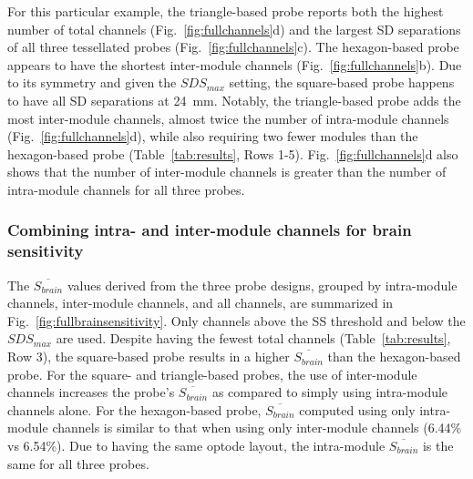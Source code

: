 \begin{figure}
\end{figure} 

For this particular example, the triangle-based probe reports both the highest number of total channels (Fig.~\ref{fig:fullchannels}d) and the largest SD separations of all three tessellated probes (Fig.~\ref{fig:fullchannels}c). The hexagon-based probe appears to have the shortest inter-module channels (Fig.~\ref{fig:fullchannels}b). Due to its symmetry and given the $SDS_{max}$ setting, the square-based probe happens to have all SD separations at 24~mm. Notably, the triangle-based probe adds the most inter-module channels, almost twice the number of intra-module channels (Fig.~\ref{fig:fullchannels}d), while also requiring two fewer modules than the hexagon-based probe (Table~\ref{tab:results}, Rows 1-5). Fig.~\ref{fig:fullchannels}d also shows that the number of inter-module channels is greater than the number of intra-module channels for all three probes.


\subsubsection{Combining intra- and inter-module channels for brain sensitivity}
The $\overline{S_{brain}}$ values derived from the three probe designs, grouped by intra-module channels, inter-module channels, and all channels, are summarized in Fig.~\ref{fig:fullbrainsensitivity}. Only channels above the SS threshold and below the $SDS_{max}$ are used. Despite having the fewest total channels (Table~\ref{tab:results}, Row 3), the square-based probe results in a higher $\overline{S_{brain}}$ than the hexagon-based probe. For the square- and triangle-based probes, the use of inter-module channels increases the probe's $\overline{S_{brain}}$ as compared to simply using intra-module channels alone. For the hexagon-based probe, $\overline{S_{brain}}$ computed using only intra-module channels is similar to that when using only inter-module channels (6.44\% vs 6.54\%). Due to having the same optode layout, the intra-module $\overline{S_{brain}}$ is the same for all three probes. 

